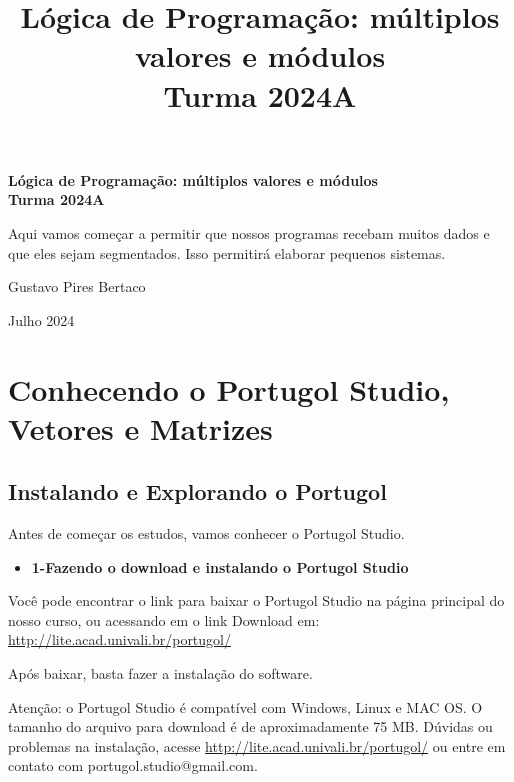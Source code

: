 \documentclass{article}
\title{\textbf{Lógica de Programação: múltiplos valores e módulos} \\ Turma 2024A}
\author{}
\date{}
\begin{document}
\begin{titlepage}
    \centering
    \vspace*{4cm}
    {\huge\bfseries Lógica de Programação: múltiplos valores e módulos\\ Turma 2024A\par}
    \vspace{2cm}
    \begin{tcolorbox}[colback=blue!5!white, colframe=blue!75!black, title=Descrição do Curso]
        \small Aqui vamos começar a permitir que nossos programas recebam muitos dados e que eles sejam segmentados. Isso permitirá elaborar pequenos sistemas. 
    \end{tcolorbox}
    \vfill
    {\Large Gustavo Pires Bertaco\par}
    {\large Julho 2024\par}
\end{titlepage}

\newpage

\renewcommand{\contentsname}{Sumário}
\tableofcontents

\newpage

\section{Conhecendo o Portugol Studio, Vetores e Matrizes}
\subsection{Instalando e Explorando o Portugol}
Antes de começar os estudos, vamos conhecer o Portugol Studio.

\begin{itemize}
    \item \textbf{1-Fazendo o download e instalando o Portugol Studio}
\end{itemize}

Você pode encontrar o link para baixar o Portugol Studio na página principal do nosso curso, ou acessando em o link Download em: \href{http://lite.acad.univali.br/portugol/}{http://lite.acad.univali.br/portugol/}

Após baixar, basta fazer a instalação do software.

Atenção: o Portugol Studio é compatível com Windows, Linux e MAC OS. O tamanho do arquivo para download é de aproximadamente 75 MB. Dúvidas ou problemas na instalação, acesse \href{http://lite.acad.univali.br/portugol/}{http://lite.acad.univali.br/portugol/} ou entre em contato com portugol.studio@gmail.com. 
\end{document}
